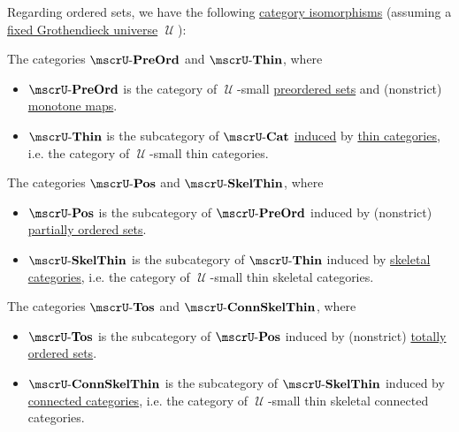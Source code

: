 \begin{theorem}\label{thm:order_category_isomorphism}
  Regarding ordered sets, we have the following \hyperref[rem:category_similarity/isomorphism]{category isomorphisms} (assuming a \hyperref[def:category_size]{fixed Grothendieck universe} \( \mscrU \)):
  \begin{thmenum}
     The categories \hyperref[def:preordered_set/category]{\( \ucat{PreOrd} \)} and \( \ucat{Thin} \), where
    \begin{itemize}
      \item \( \ucat{PreOrd} \) is the category of \( \mscrU \)-small \hyperref[def:preordered_set]{preordered sets} and (nonstrict) \hyperref[def:preordered_set/homomorphism]{monotone maps}.

      \item \( \ucat{Thin} \) is the subcategory of \hyperref[def:category_of_small_categories]{\( \ucat{Cat} \)} \hyperref[def:subcategory]{induced} by \hyperref[def:thin_category]{thin categories}, i.e. the category of \( \mscrU \)-small thin categories.
    \end{itemize}

     The categories \hyperref[def:partially_ordered_set/category]{\( \ucat{Pos} \)} and \( \ucat{SkelThin} \), where
    \begin{itemize}
      \item \( \ucat{Pos} \) is the subcategory of \( \ucat{PreOrd} \) induced by (nonstrict) \hyperref[def:partially_ordered_set]{partially ordered sets}.

      \item \( \ucat{SkelThin} \) is the subcategory of \( \ucat{Thin} \) induced by \hyperref[def:skeletal_category]{skeletal categories}, i.e. the category of \( \mscrU \)-small thin skeletal categories.
    \end{itemize}

     The categories \hyperref[def:totally_ordered_set]{\( \ucat{Tos} \)} and \( \ucat{ConnSkelThin} \), where
    \begin{itemize}
      \item \( \ucat{Tos} \) is the subcategory of \( \ucat{Pos} \) induced by (nonstrict) \hyperref[def:totally_ordered_set]{totally ordered sets}.

      \item \( \ucat{ConnSkelThin} \) is the subcategory of \( \ucat{SkelThin} \) induced by \hyperref[def:connected_category]{connected categories}, i.e. the category of \( \mscrU \)-small thin skeletal connected categories.
    \end{itemize}
  \end{thmenum}
\end{theorem}
